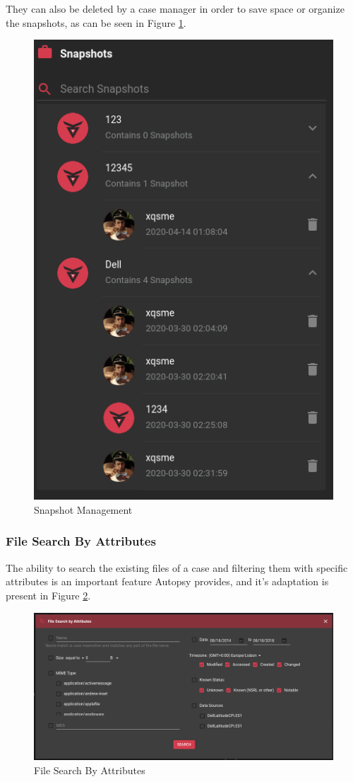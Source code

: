They can also be deleted by a case manager in order to save space or organize the snapshots, as can be seen in Figure \ref{fig:snapshotmanage}.

\begin{figure}[ht]
 \centering
 \includegraphics[width=0.35\linewidth]{imgs/snapshotmanage.png}
 \caption{Snapshot Management}
 \label{fig:snapshotmanage}
\end{figure}

\subsubsection*{File Search By Attributes}

The ability to search the existing files of a case and filtering them with specific attributes is an important feature Autopsy provides, and it's adaptation is present in Figure \ref{fig:search}.

\begin{figure}[ht]
 \centering
 \includegraphics[width=\linewidth]{imgs/search.png}
 \caption{File Search By Attributes}
 \label{fig:search}
\end{figure}

\bigskip

